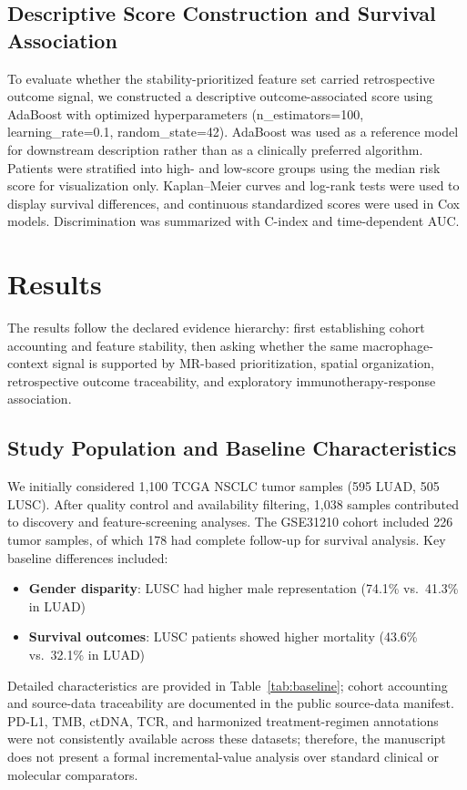 \documentclass[pdflatex,sn-mathphys-num,referee,lineno]{sn-jnl}
\theoremstyle{thmstyleone}%
\theoremstyle{thmstyletwo}%
\theoremstyle{thmstylethree}%
\begin{document}
\subsection{Descriptive Score Construction and Survival Association}
To evaluate whether the stability-prioritized feature set carried retrospective outcome signal, we constructed a descriptive outcome-associated score using AdaBoost with optimized hyperparameters (n\_estimators=100, learning\_rate=0.1, random\_state=42). AdaBoost was used as a reference model for downstream description rather than as a clinically preferred algorithm. Patients were stratified into high- and low-score groups using the median risk score for visualization only. Kaplan--Meier curves and log-rank tests were used to display survival differences, and continuous standardized scores were used in Cox models. Discrimination was summarized with C-index and time-dependent AUC.

\section{Results}\label{sec:results}

The results follow the declared evidence hierarchy: first establishing cohort accounting and feature stability, then asking whether the same macrophage-context signal is supported by MR-based prioritization, spatial organization, retrospective outcome traceability, and exploratory immunotherapy-response association.

\subsection{Study Population and Baseline Characteristics}\label{subsec:baseline}

We initially considered 1,100 TCGA NSCLC tumor samples (595 LUAD, 505 LUSC). After quality control and availability filtering, 1,038 samples contributed to discovery and feature-screening analyses. The GSE31210 cohort included 226 tumor samples, of which 178 had complete follow-up for survival analysis. Key baseline differences included:
\begin{itemize}
    \item \textbf{Gender disparity}: LUSC had higher male representation (74.1\% vs.\ 41.3\% in LUAD)
    \item \textbf{Survival outcomes}: LUSC patients showed higher mortality (43.6\% vs.\ 32.1\% in LUAD)
\end{itemize}
Detailed characteristics are provided in Table~\ref{tab:baseline}; cohort accounting and source-data traceability are documented in the public source-data manifest.
PD-L1, TMB, ctDNA, TCR, and harmonized treatment-regimen annotations were not consistently available across these datasets; therefore, the manuscript does not present a formal incremental-value analysis over standard clinical or molecular comparators.
\end{document}
